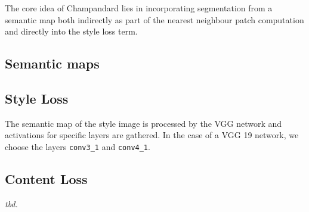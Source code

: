 The core idea of Champandard lies in incorporating segmentation from a semantic map both indirectly as part of the nearest neighbour patch computation and directly into the style loss term.

\subsection{Semantic maps}


\subsection{Style Loss}

The semantic map of the style image is processed by the VGG network and activations for specific layers are gathered. In the case of a VGG 19 network, we choose the layers \texttt{conv3\_1} and \texttt{conv4\_1}. 


\subsection{Content Loss}

\textit{tbd.}
